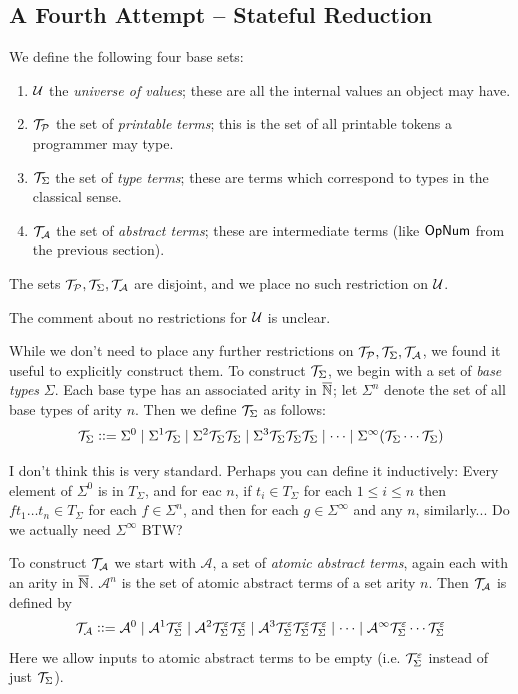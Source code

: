 \documentclass{llncs}
\newcommand{\yoni}[1]{{\begin{mdframed}[linecolor=red]{\color{red}#1}\end{mdframed}}}
\begin{document}
\subsection{A Fourth Attempt -- Stateful Reduction}

We define the following four base sets:
\begin{enumerate}
    \item $\mathcal U$ the \textit{universe of values}; these are all the internal values an object may have.
    \item $\mathcal T_{\mathcal P}$ the set of \textit{printable terms}; this is the set of all printable tokens a programmer may type.
    \item $\mathcal T_{\Sigma}$ the set of \textit{type terms}; these are terms which correspond to types in the classical sense.
    \item $\mathcal T_{\mathcal A}$ the set of \textit{abstract terms}; these are intermediate terms (like $\mathsf{Op}\mathsf{Num}$ from the previous section).
\end{enumerate}
The sets $\mathcal T_{\mathcal P},\mathcal T_{\Sigma},\mathcal T_{\mathcal A}$ are disjoint, and we place no such restriction on $\mathcal U$.
\yoni{The comment about no restrictions for $\mathcal U$ is unclear.}

While we don't need to place any further restrictions on $\mathcal T_{\mathcal P},\mathcal T_{\Sigma},\mathcal T_{\mathcal A}$, we found it useful to explicitly construct them.
To construct $\mathcal T_{\Sigma}$, we begin with a set of \textit{base types} $\Sigma$.
Each base type has an associated arity in $\overline{\mathbb N}$; let $\Sigma^n$ denote the set of all base types of arity $n$.
Then we define $\mathcal T_{\Sigma}$ as follows:
\[ \mathcal T_{\Sigma} \mathrel{{\mathop:}{\mathop:}{=}} \Sigma^0 \mid \Sigma^1\mathcal T_{\Sigma} \mid \Sigma^2\mathcal T_{\Sigma}\mathcal T_{\Sigma} \mid \Sigma^3\mathcal T_{\Sigma}\mathcal T_{\Sigma}\mathcal T_{\Sigma} \mid \cdots \mid \Sigma^\infty(\mathcal T_{\Sigma}\cdots\mathcal T_{\Sigma}) \]

\yoni{I don't think this is very standard. Perhaps you can define
 it inductively: Every element of $\Sigma^0$ is in $T_{\Sigma}$,
  and for eac $n$, if $t_i\in T_{\Sigma}$ for each $1\leq i \leq n$
  then $f t_1 \ldots t_n \in T_{\Sigma}$ for each $f\in\Sigma^{n}$,
  and then for each $g\in\Sigma^{\infty}$ and any $n$, similarly...
Do we actually need $\Sigma^{\infty}$ BTW? }

To construct $\mathcal T_{\mathcal A}$ we start with $\mathcal A$, a set of \textit{atomic abstract terms}, again each with an arity in $\overline{\mathbb N}$.
$\mathcal A^n$ is the set of atomic abstract terms of a set arity $n$.
Then $\mathcal T_{\mathcal A}$ is defined by
\[ \mathcal T_{\mathcal A} \mathrel{{\mathop:}{\mathop:}{=}} \mathcal A^0\mid\mathcal A^1\mathcal T_{\Sigma}^\varepsilon\mid\mathcal A^2\mathcal T_{\Sigma}^\varepsilon\mathcal T_{\Sigma}^\varepsilon\mid\mathcal A^3\mathcal T_{\Sigma}^\varepsilon\mathcal T_{\Sigma}^\varepsilon\mathcal T_{\Sigma}^\varepsilon\mid\cdots\mid
\mathcal A^\infty\mathcal T_{\Sigma}^\varepsilon\cdots\mathcal T_{\Sigma}^\varepsilon \]
Here we allow inputs to atomic abstract terms to be empty (i.e. $\mathcal T_{\Sigma}^\varepsilon$ instead of just $\mathcal T_{\Sigma}$).
\end{document}
